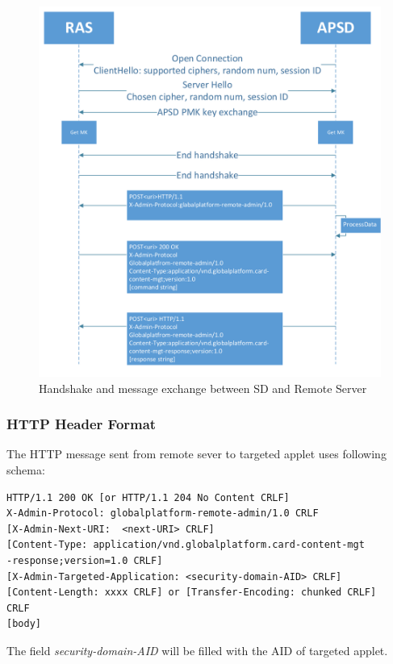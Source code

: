 \begin{figure}[!htbp]
	\centering
	\includegraphics[width=1\textwidth]{communication-flow}
		\caption{Handshake and message exchange between SD and Remote Server}
	\label{fig:communication-flow}
\end{figure}

\subsubsection{HTTP Header Format}
The HTTP message sent from remote sever to targeted applet uses following schema\cite{gp}:
\begin{Verbatim}[fontsize=\relsize{-1}, frame=lines,framesep=4mm, label=\fbox{\small\emph{Http Request Schema}}]
HTTP/1.1 200 OK [or HTTP/1.1 204 No Content CRLF]
X-Admin-Protocol: globalplatform-remote-admin/1.0 CRLF
[X-Admin-Next-URI:  <next-URI> CRLF]
[Content-Type: application/vnd.globalplatform.card-content-mgt
-response;version=1.0 CRLF]
[X-Admin-Targeted-Application: <security-domain-AID> CRLF]
[Content-Length: xxxx CRLF] or [Transfer-Encoding: chunked CRLF]
CRLF
[body]
\end{Verbatim}
The field \emph{security-domain-AID} will be filled with the AID of targeted applet.


